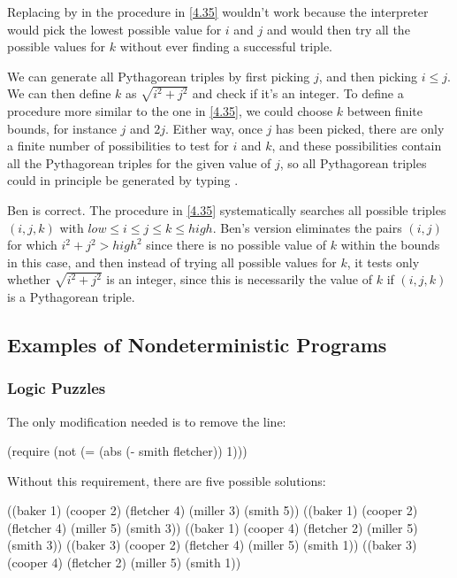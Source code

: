 \begin{exe}[4.36]
    Replacing  by  in 
    the procedure in \autoref{4.35} wouldn’t work because the interpreter would 
    pick the lowest possible value for $i$ and $j$ and would then try all the 
    possible values for $k$ without ever finding a successful triple.

    We can generate all Pythagorean triples by first picking $j$, and then 
    picking $i \leq j$. We can then define $k$ as $\sqrt{i^2 + j^2}$ and check 
    if it’s an integer. To define a procedure more similar to the one in 
    \autoref{4.35}, we could choose $k$ between finite bounds, for instance $j$ 
    and $2j$. Either way, once $j$ has been picked, there are only a finite 
    number of possibilities to test for $i$ and $k$, and these possibilities 
    contain all the Pythagorean triples for the given value of $j$, so all 
    Pythagorean triples could in principle be generated by typing 
    .
\end{exe}

\begin{exe}[4.37]
    Ben is correct. The procedure in \autoref{4.35} systematically searches all 
    possible triples $(i, j, k)$ with $low \leq i \leq j \leq k \leq high$. 
    Ben’s version eliminates the pairs $(i, j)$ for which $i^2 + j^2 > high^2$ 
    since there is no possible value of $k$ within the bounds in this case, and 
    then instead of trying all possible values for $k$, it tests only whether 
    $\sqrt{i^2 + j^2}$ is an integer, since this is necessarily the value of $k$ 
    if $(i, j, k)$ is a Pythagorean triple.
\end{exe}

\subsection{Examples of Nondeterministic Programs}

\subsubsection{Logic Puzzles}

\begin{exe}[4.38]
    The only modification needed is to remove the line:
    \begin{cscm}
        (require (not (= (abs (- smith fletcher)) 1)))
    \end{cscm}
    Without this requirement, there are five possible solutions:
    \begin{cscm}
        ((baker 1) (cooper 2) (fletcher 4) (miller 3) (smith 5))
        ((baker 1) (cooper 2) (fletcher 4) (miller 5) (smith 3))
        ((baker 1) (cooper 4) (fletcher 2) (miller 5) (smith 3))
        ((baker 3) (cooper 2) (fletcher 4) (miller 5) (smith 1))
        ((baker 3) (cooper 4) (fletcher 2) (miller 5) (smith 1))
    \end{cscm}
\end{exe}

